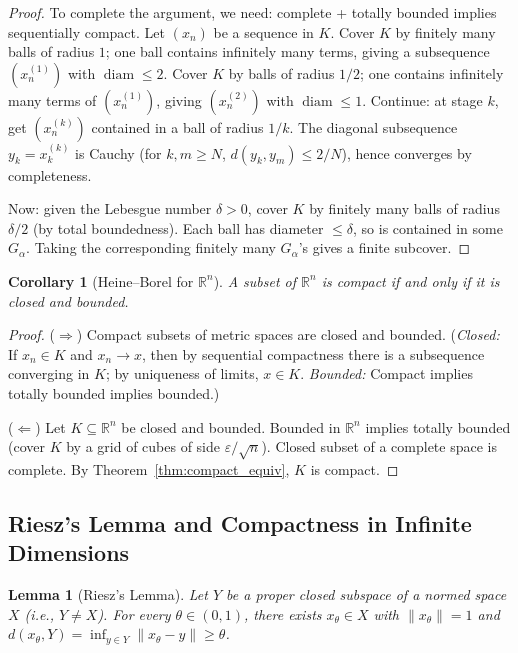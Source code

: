\documentclass[11pt,a4paper]{article}
\theoremstyle{definition}
\theoremstyle{plain}
\newtheorem{lemma}[theorem]{Lemma}
\newtheorem{corollary}[theorem]{Corollary}
\theoremstyle{remark}
\newcommand{\R}{\mathbb{R}}
\DeclareMathOperator{\diam}{diam}
\begin{document}
\begin{proof}
To complete the argument, we need: complete + totally bounded implies sequentially
compact. Let $(x_n)$ be a sequence in $K$. Cover $K$ by finitely many balls of
radius $1$; one ball contains infinitely many terms, giving a subsequence
$(x_n^{(1)})$ with $\diam \le 2$. Cover $K$ by balls of radius $1/2$; one contains
infinitely many terms of $(x_n^{(1)})$, giving $(x_n^{(2)})$ with $\diam \le 1$.
Continue: at stage $k$, get $(x_n^{(k)})$ contained in a ball of radius $1/k$.
The diagonal subsequence $y_k = x_k^{(k)}$ is Cauchy (for $k, m \ge N$,
$d(y_k, y_m) \le 2/N$), hence converges by completeness.

Now: given the Lebesgue number $\delta > 0$, cover $K$ by finitely many balls
of radius $\delta/2$ (by total boundedness). Each ball has diameter $\le \delta$,
so is contained in some $G_\alpha$. Taking the corresponding finitely many
$G_\alpha$'s gives a finite subcover.
\end{proof}

\begin{corollary}[Heine--Borel for $\R^n$]
\label{cor:heine_borel}
A subset of $\R^n$ is compact if and only if it is closed and bounded.
\end{corollary}

\begin{proof}
($\Rightarrow$) Compact subsets of metric spaces are closed and bounded.
(\emph{Closed:} If $x_n \in K$ and $x_n \to x$, then by sequential compactness
there is a subsequence converging in $K$; by uniqueness of limits, $x \in K$.
\emph{Bounded:} Compact implies totally bounded implies bounded.)

($\Leftarrow$) Let $K \subseteq \R^n$ be closed and bounded. Bounded in $\R^n$
implies totally bounded (cover $K$ by a grid of cubes of side $\varepsilon/\sqrt{n}$).
Closed subset of a complete space is complete. By Theorem~\ref{thm:compact_equiv},
$K$ is compact.
\end{proof}

\subsection{Riesz's Lemma and Compactness in Infinite Dimensions}

\begin{lemma}[Riesz's Lemma]
\label{lem:riesz}
Let $Y$ be a proper closed subspace of a normed space $X$ (i.e., $Y \ne X$). For
every $\theta \in (0,1)$, there exists $x_\theta \in X$ with $\|x_\theta\| = 1$
and $d(x_\theta, Y) = \inf_{y \in Y} \|x_\theta - y\| \ge \theta$.
\end{lemma}
\end{document}
